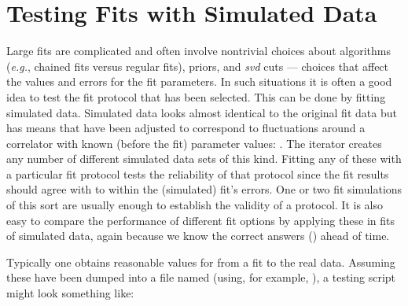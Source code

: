 \documentclass[letterpaper,10pt,english]{sphinxmanual}
\begin{document}
\section{Testing Fits with Simulated Data}
\label{corrfitter:testing-fits-with-simulated-data}
Large fits are complicated and often involve nontrivial choices about
algorithms (\emph{e.g.}, chained fits versus regular fits), priors, and
\emph{svd} cuts --- choices that affect the values and errors for the fit
parameters. In such situations it is often a good idea to test the
fit protocol that has been selected. This can be done by fitting simulated
data. Simulated data looks almost identical to the original fit
data but has means that have been adjusted to correspond to fluctuations
around a correlator with known (before the fit) parameter values: .
The {\hyperref[corrfitter:corrfitter.CorrFitter]{}} iterator  creates any number of
different simulated data sets of this kind. Fitting any of these with
a particular fit protocol tests the reliability of that protocol since
the fit results should agree with 
to within the (simulated) fit's errors. One or two fit simulations of this
sort are usually enough to establish the validity of a protocol. It is also
easy to compare the performance of different fit options by applying these in
fits of simulated data, again because we know the correct answers ()
ahead of time.

Typically one obtains reasonable values for  from a fit to the
real data. Assuming these have been dumped into a file named 
(using, for example, ), a testing script
might look something like:
\end{document}
